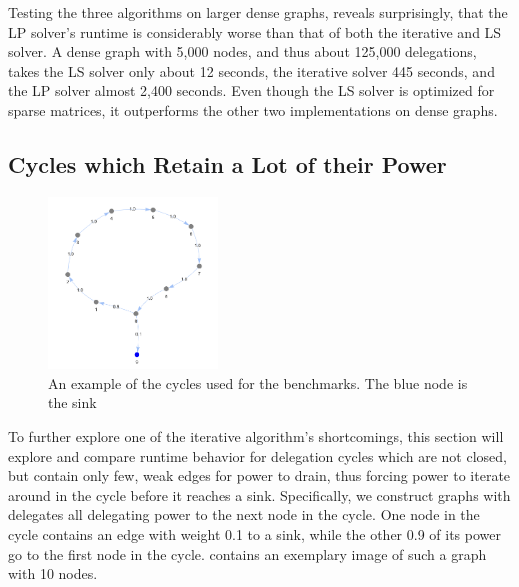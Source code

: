 Testing the three algorithms on larger dense graphs, reveals surprisingly, that the LP solver's runtime is considerably worse than that of both the iterative and LS solver. A dense graph with 5,000 nodes, and thus about 125,000 delegations, takes the LS solver only about 12 seconds, the iterative solver 445 seconds, and the LP solver almost 2,400 seconds. Even though the LS solver is optimized for sparse matrices, it outperforms the other two implementations on dense graphs.


\subsection{Cycles which Retain a Lot of their Power}
\label{subsec:cycles_draining}

\begin{figure}[h]
	\centering
	\includegraphics[width=0.4\textwidth]{big_cycle_example}
	\caption{An example of the cycles used for the benchmarks. The blue node is the sink}
	\label{fig:big_cycle_example}
\end{figure}

To further explore one of the iterative algorithm's shortcomings, this section will explore and compare runtime behavior for delegation cycles which are not closed, but contain only few, weak edges for power to drain, thus forcing power to iterate around in the cycle before it reaches a sink. Specifically, we construct graphs with delegates all delegating power to the next node in the cycle. One node in the cycle contains an edge with weight 0.1 to a sink, while the other 0.9 of its power go to the first node in the cycle.  contains an exemplary image of such a graph with 10 nodes. 

